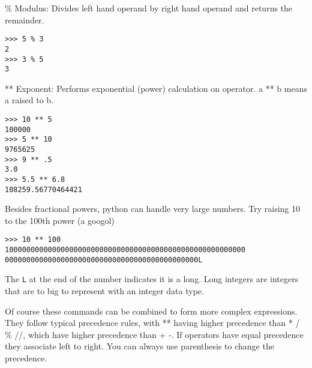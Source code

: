 \documentclass[12pt]{article}
\begin{document}


\% Modulus: Divides left hand operand by right hand operand and returns the remainder.

\begin{lstlisting}[style=bash]
>>> 5 % 3
2
>>> 3 % 5
3
\end{lstlisting}

** Exponent: Performs exponential (power) calculation on operator. a ** b means a raised to b.

\begin{lstlisting}[style=bash]
>>> 10 ** 5
100000
>>> 5 ** 10 
9765625
>>> 9 ** .5
3.0
>>> 5.5 ** 6.8
108259.56770464421
\end{lstlisting}

Besides fractional powers, python can handle very large numbers. Try raising 10 to the 100th power (a googol)

\begin{lstlisting}[style=bash]
>>> 10 ** 100
10000000000000000000000000000000000000000000000000000000
000000000000000000000000000000000000000000000L
\end{lstlisting}

The \texttt{L} at the end of the number indicates it is a long. Long integers are integers that are to big to represent with an integer data type.  




Of course these commands can be combined to form more complex expressions. They follow typical precedence rules, with ** having higher precedence than * / \% //, which have higher precedence than + -. If operators have equal precedence they associate left to right. You can always use parenthesis to change the precedence.
\end{document}
